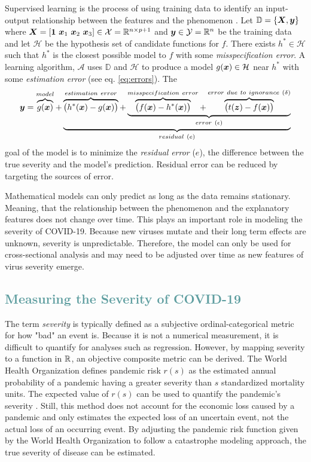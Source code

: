 \documentclass[12pt]{article}
\begin{document}
Supervised learning is the process of using training data to identify an input-output relationship between the features and the phenomenon \cite{slDef}. Let $\mathbb{D} = \{\boldsymbol{X}, \boldsymbol{y} \}$  where $\boldsymbol{X} = [\boldsymbol{1}\ \boldsymbol{x}_1\ \boldsymbol{x}_2\ \boldsymbol{x}_3] \in \mathcal{X} = \mathbb{R}^{n \times p+1}$ and $\boldsymbol{y} \in \mathcal{Y} = \mathbb{R}^{n}$ be the training data and let $\mathcal{H}$ be the hypothesis set of candidate functions for $f$. There exists $h^* \in \mathcal{H}$  such that $h^*$ is the closest possible model to $f$ with some \emph{misspecification error}. A learning algorithm, $\mathcal{A}$ uses $\mathbb{D}$ and $\mathcal{H}$ to produce a model $g(\boldsymbol{x}) \in \mathcal{H}$ near $h^*$ with some \emph{estimation error} (see eq. \ref{eq:errors}). The 
\begin{align} \label{eq:errors}
    \y = \overbrace{g(\x)}^{model} + \underbrace{\overbrace{\big(h^*(\x) - g(\x)\big)}^{estimation\ error} + \underbrace{\overbrace{\big(f(\x) - h^*(\x)\big)}^{misspecification\ error} + \overbrace{\big(t(\z) - f(\x)\big)}^{error\ due\ to\ ignorance\ (\delta)}}_{error\ (\epsilon)}}_{residual\ (e)}
\end{align}
goal of the model is to minimize the \emph{residual} \emph{error} ($e$), the difference between the true severity and the model's prediction. Residual error can be reduced by targeting the sources of error. 

Mathematical models can only predict as long as the data remains stationary. Meaning, that the relationship between the phenomenon and the explanatory features does not change over time. This plays an important role in modeling the severity of COVID-19. Because new viruses mutate and their long term effects are unknown, severity is unpredictable. Therefore, the model can only be used for cross-sectional analysis and may need to be adjusted over time as new features of virus severity emerge.


\textcolor{CadetBlue}{\section{Measuring the Severity of COVID-19}}

The term \emph{severity} is typically defined as a subjective ordinal-categorical metric for how "bad" an event is. Because it is not a numerical measurement, it is difficult to quantify for analyses such as regression. However, by mapping severity to a function in $\mathbb{R}$, an objective composite metric can be derived. The World Health Organization defines pandemic risk $r(s)$ as the estimated annual probability of a pandemic having a greater severity than $s$ standardized mortality units. The expected value of $r(s)$ can be used to quantify the pandemic's severity \cite{whoPanRisk}. Still, this method does not account for the economic loss caused by a pandemic and only estimates the expected loss of an uncertain event, not the actual loss of an occurring event. By adjusting the pandemic risk function given by the World Health Organization to follow a catastrophe modeling approach, the true severity of disease can be estimated. 
\end{document}
